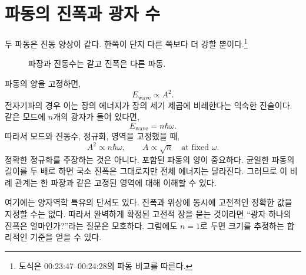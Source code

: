 \section{파동의 진폭과 광자 수}

\begin{classroomqa}\end{classroomqa}

두 파동은 진동 양상이 같다. 한쪽이 단지 다른 쪽보다 더 강할 뿐이다.\footnote{도식은 00:23:47--00:24:28의 파동 비교를 따른다.}

\begin{figure}[t]\centering
{}\caption{파장과 진동수는 같고 진폭은 다른 파동.}\end{figure}

파동의 양을 고정하면, \begin{equation}
E_{\text{wave}}\propto A^2.
\end{equation}전자기파의 경우 이는 장의 에너지가 장의 세기 제곱에 비례한다는 익숙한 진술이다. 같은 모드에 \(n\)개의 광자가 들어 있다면, \begin{equation}
E_{\text{wave}}=n\hbar\omega.
\end{equation}따라서 모드와 진동수, 정규화, 영역을 고정했을 때, \begin{equation}
A^2\propto n\hbar\omega,
\qquad
A\propto\sqrt n\quad\text{at fixed }\omega.
\end{equation}정확한 정규화를 주장하는 것은 아니다. 포함된 파동의 양이 중요하다. 균일한 파동의 길이를 두 배로 하면 국소 진폭은 그대로지만 전체 에너지는 달라진다. 그러므로 이 비례 관계는 한 파장과 같은 고정된 영역에 대해 이해할 수 있다.

여기에는 양자역학 특유의 단서도 있다. 진폭과 위상에 동시에 고전적인 정확한 값을 지정할 수는 없다. 따라서 완벽하게 확정된 고전적 장을 묻는 것이라면 ``광자 하나의 진폭은 얼마인가?''라는 질문은 모호하다. 그럼에도 \(n=1\)로 두면 크기를 추정하는 합리적인 기준을 얻을 수 있다.

